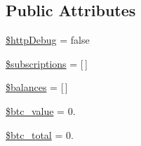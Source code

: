 \subsection*{Public Attributes}
\begin{DoxyCompactItemize}
\item 
\hyperlink{classBinance_1_1API_aaaf9a901342001f8734bfab6ba505205}{\$http\-Debug} = false
\item 
\hyperlink{classBinance_1_1API_a858ac2cec1de7719779b6c517adcb0bf}{\$subscriptions} = \mbox{[}$\,$\mbox{]}
\item 
\hyperlink{classBinance_1_1API_a706b2458b10d731ea4918714c333a845}{\$balances} = \mbox{[}$\,$\mbox{]}
\item 
\hyperlink{classBinance_1_1API_af80ef162a101ffa0963d977126d6811d}{\$btc\-\_\-value} = 0.
\item 
\hyperlink{classBinance_1_1API_a80f67dda302da9465596ad5e0bd86ce2}{\$btc\-\_\-total} = 0.
\end{DoxyCompactItemize}
